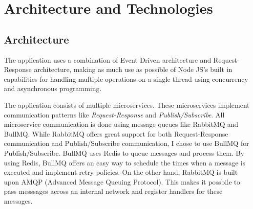 
\chapter{Architecture and Technologies}

\section{Architecture}

The application uses a combination of Event Driven architecture and Request-Response architecture, making as much use as possible of Node JS's\cite{NODEJS} built in capabilities for handling multiple operations on a single thread using concurrency and asynchronous programming.

The application consists of multiple microservices. These microservices implement communication patterns like \textit{Request-Response} and \textit{Publish/Subscribe}. All microservice communication is done using message queues like RabbitMQ and BullMQ. While RabbitMQ offers great support for both Request-Response communication and Publish/Subscribe communication, I chose to use BullMQ for Publish/Subscribe. BullMQ uses Redis to queue messages and process them. By using Redis, BullMQ offers an easy way to schedule the times when a message is executed and implement retry policies. On the other hand, RabbitMQ is built upon AMQP (Advanced Message Queuing Protocol)\cite{AMQP}. This makes it possbile to pass messsages across an internal network and register handlers for these messages. 

